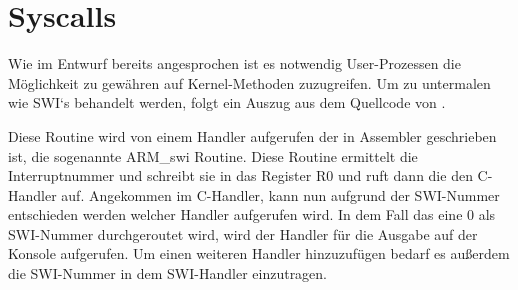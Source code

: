 \section{Syscalls}
Wie im Entwurf bereits angesprochen ist es notwendig User-Prozessen die M\"oglichkeit zu gew\"ahren auf Kernel-Methoden zuzugreifen. Um zu untermalen wie SWI`s behandelt werden, folgt ein Auszug aus dem Quellcode von \mops.

Diese Routine wird von einem Handler aufgerufen der in Assembler geschrieben ist, die sogenannte ARM\_swi Routine. Diese Routine ermittelt die Interruptnummer und schreibt sie in das Register R0 und ruft dann die den C-Handler auf. Angekommen im C-Handler, kann nun aufgrund der SWI-Nummer entschieden werden welcher Handler aufgerufen wird. In dem Fall das eine 0 als SWI-Nummer durchgeroutet wird, wird der Handler f\"ur die Ausgabe auf der Konsole aufgerufen. Um einen weiteren Handler hinzuzuf\"ugen bedarf es au\ss erdem die SWI-Nummer in dem SWI-Handler einzutragen.

